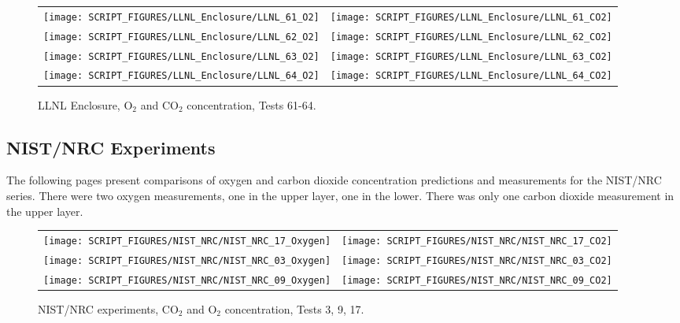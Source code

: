 \begin{figure}[p]
\begin{tabular*}{\textwidth}{l@{\extracolsep{\fill}}r}
\texttt{[image: SCRIPT\_FIGURES/LLNL\_Enclosure/LLNL\_61\_O2]} &
\texttt{[image: SCRIPT\_FIGURES/LLNL\_Enclosure/LLNL\_61\_CO2]} \\
\texttt{[image: SCRIPT\_FIGURES/LLNL\_Enclosure/LLNL\_62\_O2]} &
\texttt{[image: SCRIPT\_FIGURES/LLNL\_Enclosure/LLNL\_62\_CO2]} \\
\texttt{[image: SCRIPT\_FIGURES/LLNL\_Enclosure/LLNL\_63\_O2]} &
\texttt{[image: SCRIPT\_FIGURES/LLNL\_Enclosure/LLNL\_63\_CO2]} \\
\texttt{[image: SCRIPT\_FIGURES/LLNL\_Enclosure/LLNL\_64\_O2]} &
\texttt{[image: SCRIPT\_FIGURES/LLNL\_Enclosure/LLNL\_64\_CO2]}
\end{tabular*}
\caption{LLNL Enclosure, O$_2$ and CO$_2$ concentration, Tests 61-64.}
\label{LLNL_Gas_16}
\end{figure}


\clearpage


\subsection{NIST/NRC Experiments}

The following pages present comparisons of oxygen and carbon dioxide concentration predictions and measurements for the
NIST/NRC series. There were two oxygen measurements, one in the upper layer, one in the lower.  There was only one carbon
dioxide measurement in the upper layer.

\begin{figure}[h]
\begin{tabular*}{\textwidth}{l@{\extracolsep{\fill}}r}
\texttt{[image: SCRIPT\_FIGURES/NIST\_NRC/NIST\_NRC\_17\_Oxygen]} &
\texttt{[image: SCRIPT\_FIGURES/NIST\_NRC/NIST\_NRC\_17\_CO2]} \\
\texttt{[image: SCRIPT\_FIGURES/NIST\_NRC/NIST\_NRC\_03\_Oxygen]} &
\texttt{[image: SCRIPT\_FIGURES/NIST\_NRC/NIST\_NRC\_03\_CO2]} \\
\texttt{[image: SCRIPT\_FIGURES/NIST\_NRC/NIST\_NRC\_09\_Oxygen]} &
\texttt{[image: SCRIPT\_FIGURES/NIST\_NRC/NIST\_NRC\_09\_CO2]}
\end{tabular*}
\caption{NIST/NRC experiments, CO$_2$ and O$_2$ concentration, Tests 3, 9, 17.}
\label{NIST_NRC_Gas_Open_1}
\end{figure}

